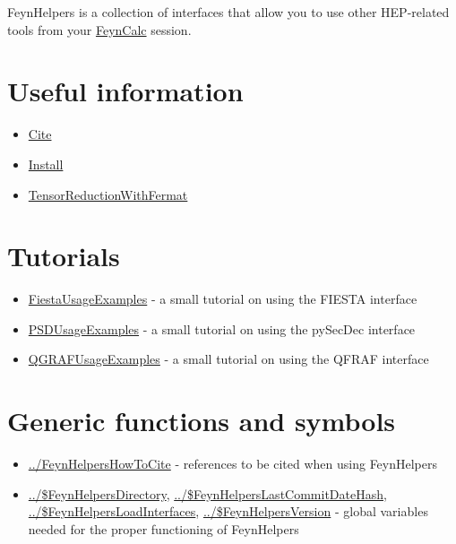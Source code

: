\documentclass[../FeynHelpersManual.tex]{subfiles}
\begin{document}
FeynHelpers is a collection of interfaces that allow you to use other
HEP-related tools from your \href{https://feyncalc.github.io}{FeynCalc}
session.

\hypertarget{useful information}{
\section{Useful information}\label{useful information}}

\begin{itemize}
\tightlist
\item
  \hyperlink{cite}{Cite}
\item
  \hyperlink{install}{Install}
\item
  \hyperlink{tensorreductionwithfermat}{TensorReductionWithFermat}
\end{itemize}

\hypertarget{tutorials}{
\section{Tutorials}\label{tutorials}}

\begin{itemize}
\tightlist
\item
  \hyperlink{fiestausageexamples}{FiestaUsageExamples} - a small
  tutorial on using the FIESTA interface
\item
  \hyperlink{psdusageexamples}{PSDUsageExamples} - a small tutorial on
  using the pySecDec interface
\item
  \hyperlink{qgrafusageexamples}{QGRAFUsageExamples} - a small tutorial
  on using the QFRAF interface
\end{itemize}

\hypertarget{generic functions and symbols}{
\section{Generic functions and symbols}\label{generic functions and symbols}}

\begin{itemize}
\tightlist
\item
  \hyperlink{../feynhelpershowtocite}{../FeynHelpersHowToCite} -
  references to be cited when using FeynHelpers
\item
  \hyperlink{../dollarfeynhelpersdirectory}{../\$FeynHelpersDirectory},
  \hyperlink{../dollarfeynhelperslastcommitdatehash}{../\$FeynHelpersLastCommitDateHash},
  \hyperlink{../dollarfeynhelpersloadinterfaces}{../\$FeynHelpersLoadInterfaces},
  \hyperlink{../dollarfeynhelpersversion}{../\$FeynHelpersVersion} -
  global variables needed for the proper functioning of FeynHelpers
\end{itemize}
\end{document}
